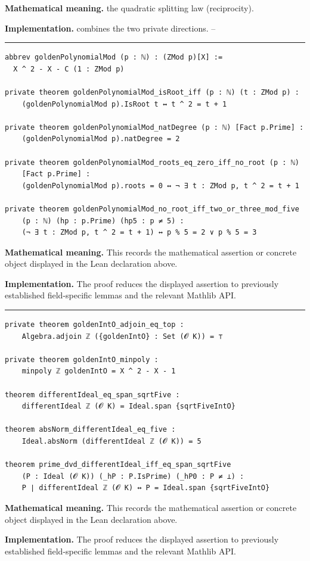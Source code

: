 \documentclass[UTF8,a4paper,11pt,fontset=fandol]{ctexart}
\theoremstyle{definition}
\newcommand{\statementsep}{\par\medskip\hrule\medskip}
\begin{document}
\noindent\textbf{Mathematical meaning.} the quadratic splitting law (reciprocity).\par
\noindent\textbf{Implementation.} combines the two private directions. --\par
\statementsep
\begin{verbatim}
abbrev goldenPolynomialMod (p : ℕ) : (ZMod p)[X] :=
  X ^ 2 - X - C (1 : ZMod p)

private theorem goldenPolynomialMod_isRoot_iff (p : ℕ) (t : ZMod p) :
    (goldenPolynomialMod p).IsRoot t ↔ t ^ 2 = t + 1

private theorem goldenPolynomialMod_natDegree (p : ℕ) [Fact p.Prime] :
    (goldenPolynomialMod p).natDegree = 2

private theorem goldenPolynomialMod_roots_eq_zero_iff_no_root (p : ℕ)
    [Fact p.Prime] :
    (goldenPolynomialMod p).roots = 0 ↔ ¬ ∃ t : ZMod p, t ^ 2 = t + 1

private theorem goldenPolynomialMod_no_root_iff_two_or_three_mod_five
    (p : ℕ) (hp : p.Prime) (hp5 : p ≠ 5) :
    (¬ ∃ t : ZMod p, t ^ 2 = t + 1) ↔ p % 5 = 2 ∨ p % 5 = 3
\end{verbatim}
\noindent\textbf{Mathematical meaning.} This records the mathematical assertion or concrete object displayed in the Lean declaration above.\par
\noindent\textbf{Implementation.} The proof reduces the displayed assertion to previously established field-specific lemmas and the relevant Mathlib API.\par
\statementsep
\begin{verbatim}
private theorem goldenIntO_adjoin_eq_top :
    Algebra.adjoin ℤ ({goldenIntO} : Set (𝓞 K)) = ⊤

private theorem goldenIntO_minpoly :
    minpoly ℤ goldenIntO = X ^ 2 - X - 1

theorem differentIdeal_eq_span_sqrtFive :
    differentIdeal ℤ (𝓞 K) = Ideal.span {sqrtFiveIntO}

theorem absNorm_differentIdeal_eq_five :
    Ideal.absNorm (differentIdeal ℤ (𝓞 K)) = 5

theorem prime_dvd_differentIdeal_iff_eq_span_sqrtFive
    (P : Ideal (𝓞 K)) (_hP : P.IsPrime) (_hP0 : P ≠ ⊥) :
    P ∣ differentIdeal ℤ (𝓞 K) ↔ P = Ideal.span {sqrtFiveIntO}
\end{verbatim}
\noindent\textbf{Mathematical meaning.} This records the mathematical assertion or concrete object displayed in the Lean declaration above.\par
\noindent\textbf{Implementation.} The proof reduces the displayed assertion to previously established field-specific lemmas and the relevant Mathlib API.\par
\end{document}
